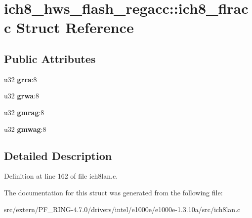 \hypertarget{structich8__hws__flash__regacc_1_1ich8__flracc}{
\section{ich8\_\-hws\_\-flash\_\-regacc::ich8\_\-flracc Struct Reference}
\label{structich8__hws__flash__regacc_1_1ich8__flracc}
}
\subsection*{Public Attributes}
\begin{DoxyCompactItemize}
\item 
\hypertarget{structich8__hws__flash__regacc_1_1ich8__flracc_a3ac9941bd9be338b65bfe30b5e58d64e}{
u32 {\bfseries grra}:8}
\label{structich8__hws__flash__regacc_1_1ich8__flracc_a3ac9941bd9be338b65bfe30b5e58d64e}

\item 
\hypertarget{structich8__hws__flash__regacc_1_1ich8__flracc_aea5dce0cdeb851a70b62d2ae55c7dc75}{
u32 {\bfseries grwa}:8}
\label{structich8__hws__flash__regacc_1_1ich8__flracc_aea5dce0cdeb851a70b62d2ae55c7dc75}

\item 
\hypertarget{structich8__hws__flash__regacc_1_1ich8__flracc_af1637d6141ff4197b4b4e6650d0bf004}{
u32 {\bfseries gmrag}:8}
\label{structich8__hws__flash__regacc_1_1ich8__flracc_af1637d6141ff4197b4b4e6650d0bf004}

\item 
\hypertarget{structich8__hws__flash__regacc_1_1ich8__flracc_adf953cf7975e96bd2fae7fd256d85539}{
u32 {\bfseries gmwag}:8}
\label{structich8__hws__flash__regacc_1_1ich8__flracc_adf953cf7975e96bd2fae7fd256d85539}

\end{DoxyCompactItemize}


\subsection{Detailed Description}


Definition at line 162 of file ich8lan.c.



The documentation for this struct was generated from the following file:\begin{DoxyCompactItemize}
\item 
src/extern/PF\_\-RING-\/4.7.0/drivers/intel/e1000e/e1000e-\/1.3.10a/src/ich8lan.c\end{DoxyCompactItemize}
